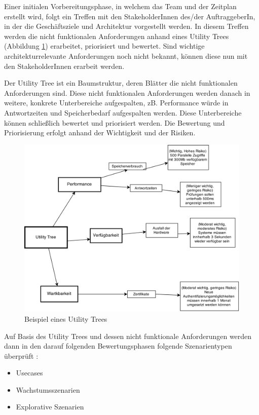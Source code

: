 Einer initialen Vorbereitungsphase, in welchem das Team und der Zeitplan erstellt wird, folgt ein Treffen mit den StakeholderInnen des/der AuftraggeberIn, in der die Geschäftsziele und Architektur vorgestellt werden. In diesem Treffen werden die nicht funktionalen Anforderungen anhand eines Utility Trees (Abbildung \ref{fig:utility}) erarbeitet, priorisiert und bewertet. Sind wichtige architekturrelevante Anforderungen noch nicht bekannt, können diese nun mit den StakeholderInnen erarbeit werden. \cite[S. 184-199]{basiswissen}

Der Utility Tree ist ein Baumstruktur, deren Blätter die nicht funktionalen Anforderungen sind. Diese nicht funktionalen Anforderungen werden danach in weitere, konkrete Unterbereiche aufgespalten, zB. Performance würde in Antwortzeiten und Speicherbedarf aufgespalten werden. Diese Unterbereiche können schließlich bewertet und priorisiert werden. Die Bewertung und Priorisierung erfolgt anhand der Wichtigkeit und der Risiken.

\begin{figure}[H]
    \centering
    \includegraphics[scale=0.3]{img/utilitytree.png}
    \caption{Beispiel eines Utility Trees \cite[S. 17]{ATAM}}
    \label{fig:utility}
\end{figure}

Auf Basis des Utility Trees und dessen nicht funktionale Anforderungen werden dann in den darauf folgenden Bewertungsphasen folgende Szenarientypen überprüft \cite[S. 62-67]{review}\cite[S. 188]{basiswissen}:

\begin{itemize}
  \item Usecases
  \item Wachstumsszenarien
  \item Explorative Szenarien
\end{itemize}


